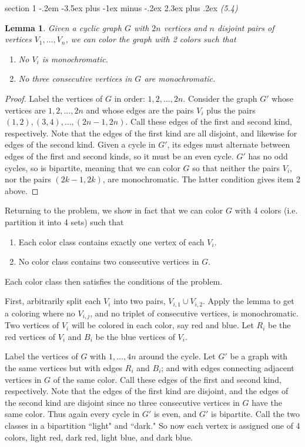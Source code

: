 \documentclass[12pt]{article}
\makeatletter
\theoremstyle{norm}
\newtheorem{lem}[thm]{Lemma}
\newenvironment{problem}{\@startsection
       {section}
       {1}
       {-.2em}
       {-3.5ex plus -1ex minus -.2ex}
       {2.3ex plus .2ex}
       {\pagebreak[3]%
       \large\bf\noindent{Problem }
       }
       }
       {%
       }
\makeatother
\begin{document}
\begin{problem} {\it (5.4)}
\begin{lem}
Given a cyclic graph $G$ with $2n$ vertices and $n$ disjoint pairs of vertices $V_1, \ldots, V_n$, we can color the graph with 2 colors such that
\begin{enumerate}
\item
No $V_i$ is monochromatic.
\item
No three consecutive vertices in $G$ are monochromatic.
\end{enumerate}
\end{lem}
\begin{proof}
Label the vertices of $G$ in order: $1,2,\ldots, 2n$. 
Consider the graph $G'$ whose vertices are $1,2,\ldots, 2n$ and whose edges are the pairs $V_i$ plus the pairs $(1,2),(3,4),\ldots, (2n-1,2n)$. Call these edges of the first and second kind, respectively. Note that the edges of the first kind are all disjoint, and likewise for edges of the second kind. Given a cycle in $G'$, its edges must alternate between edges of the first and second kinds, so it must be an even cycle. $G'$ has no odd cycles, so is bipartite, meaning that we can color $G$ so that neither the pairs $V_i$, nor the pairs $(2k-1,2k)$, are monochromatic. The latter condition gives item 2 above.
\end{proof}
Returning to the problem, we show in fact that we can color $G$ with 4 colors (i.e. partition it into 4 sets) such that
\begin{enumerate}
\item
Each color class contains exactly one vertex of each $V_i$.
\item 
No color class contains two consecutive vertices in $G$.
\end{enumerate}
Each color class then satisfies the conditions of the problem.

First, arbitrarily split each $V_i$ into two pairs, $V_{i,1}\cup V_{i,2}$. Apply the lemma to get a coloring where no $V_{i,j}$, and no triplet of consecutive vertices, is monochromatic. Two vertices of $V_i$ will be colored in each color, say red and blue. Let $R_i$ be the red vertices of $V_i$ and $B_i$ be the blue vertices of $V_i$.

Label the vertices of $G$ with $1,\ldots, 4n$ around the cycle. Let $G'$ be a graph with the same vertices but with edges $R_i$ and $B_i$; and with edges connecting adjacent vertices in $G$ of the same color. Call these edges of the first and second kind, respectively. Note that the edges of the first kind are disjoint, and the edges of the second kind are disjoint since no three consecutive vertices in $G$ have the same color. Thus again every cycle in $G'$ is even, and $G'$ is bipartite. Call the two classes in a bipartition ``light" and ``dark." So now each vertex is assigned one of 4 colors, light red, dark red, light blue, and dark blue.


\end{problem}
\end{document}
